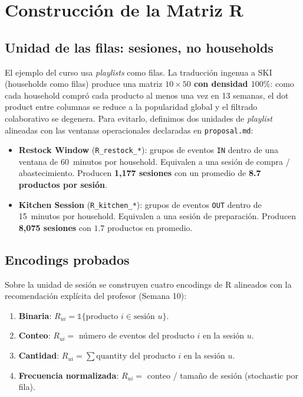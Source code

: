 \documentclass[12pt,a4paper]{article}
\newcommand{\metric}[1]{\textcolor{metricblue}{\textbf{#1}}}
\newcommand{\code}[1]{\texttt{\small #1}}
\begin{document}
\section{Construcción de la Matriz R}
\label{sec:R}

\subsection{Unidad de las filas: sesiones, no households}

El ejemplo del curso usa \textit{playlists} como filas. La traducción ingenua a SKI (households como filas) produce una matriz \metric{$10\times 50$ con densidad $100\%$}: como cada household compró cada producto al menos una vez en 13 semanas, el dot product entre columnas se reduce a la popularidad global y el filtrado colaborativo se degenera. Para evitarlo, definimos dos unidades de \textit{playlist} alineadas con las ventanas operacionales declaradas en \code{proposal.md}:

\begin{itemize}
    \item \textbf{Restock Window} (\code{R\_restock\_*}): grupos de eventos \code{IN} dentro de una ventana de 60~minutos por household. Equivalen a una sesión de compra / abastecimiento. Producen \metric{1{,}177 sesiones} con un promedio de \metric{8.7 productos por sesión}.
    \item \textbf{Kitchen Session} (\code{R\_kitchen\_*}): grupos de eventos \code{OUT} dentro de 15~minutos por household. Equivalen a una sesión de preparación. Producen \metric{8{,}075 sesiones} con $1.7$ productos en promedio.
\end{itemize}

\subsection{Encodings probados}
\label{sec:encodings}

Sobre la unidad de sesión se construyen cuatro encodings de R alineados con la recomendación explícita del profesor (Semana 10):

\begin{enumerate}
    \item \textbf{Binaria}: $R_{ui} = \mathbb{1}\{\text{producto } i \in \text{sesión } u\}$.
    \item \textbf{Conteo}: $R_{ui} = $ número de eventos del producto $i$ en la sesión $u$.
    \item \textbf{Cantidad}: $R_{ui} = \sum \text{quantity}$ del producto $i$ en la sesión $u$.
    \item \textbf{Frecuencia normalizada}: $R_{ui} = $ conteo / tamaño de sesión (stochastic por fila).
\end{enumerate}
\end{document}
